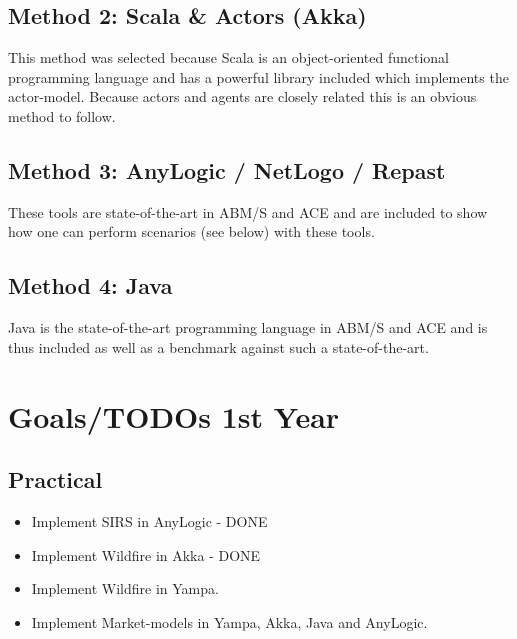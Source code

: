 \documentclass{article}
\begin{document}
\subsection{Method 2: Scala \& Actors (Akka)}
This method was selected because Scala is an object-oriented functional programming language and has a powerful library included which implements the actor-model. Because actors and agents are closely related this is an obvious method to follow.

\subsection{Method 3: AnyLogic / NetLogo / Repast}
These tools are state-of-the-art in ABM/S and ACE and are included to show how one can perform scenarios (see below) with these tools.

\subsection{Method 4: Java}
Java is the state-of-the-art programming language in ABM/S and ACE and is thus included as well as a benchmark against such a state-of-the-art.


\pagebreak

\section{Goals/TODOs 1st Year}
\subsection{Practical}
\begin{itemize}
\item Implement SIRS in AnyLogic - DONE
\item Implement Wildfire in Akka - DONE
\item Implement Wildfire in Yampa.
\item Implement Market-models in Yampa, Akka, Java and AnyLogic.
\end{itemize}
\end{document}
